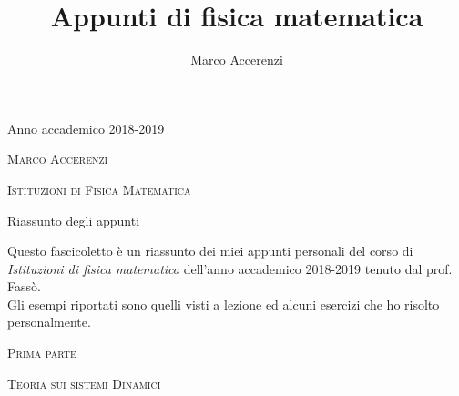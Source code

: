 \documentclass[11pt,a4paper,twoside]{book}
\author{Marco Accerenzi}
\date{}
\title{Appunti di fisica matematica}
\theoremstyle{esss}
\theoremstyle{dotless}
\numberwithin{equation}{section} %
\begin{document}

\frontmatter
\pagestyle{empty}

\begin{titlepage}
	\begin{center}

	\begin{center}
		\centering
		Anno accademico 2018-2019\par
		\vspace{.05\textheight}
	\end{center}	

		\vspace{.1\textheight}
		{\LARGE\scshape \textsc{Marco Accerenzi}\par}
		\vspace{.1\textheight}
		\textsc{}\par
		\vspace{.05\textheight}
		{\Huge \textsc{Istituzioni di Fisica Matematica}\par}
		\vspace{.05\textheight}
		{\large Riassunto degli appunti\par}
		\vfill
		{\large
Questo fascicoletto è un riassunto dei miei appunti personali del corso di \textit{Istituzioni di fisica matematica} dell'anno accademico 2018-2019 tenuto dal prof. Fassò. \\Gli esempi riportati sono quelli visti a lezione ed alcuni esercizi che ho risolto personalmente.
  }
  \vspace{2cm} 
\end{center}
\end{titlepage}

\tableofcontents

\cleardoublepage
\mainmatter\setcounter{page}{1}
\pagestyle{fancy}
\thispagestyle{plain}
	\begin{center}
		\vspace{.1\textheight}
		{\LARGE\scshape \textsc{Prima parte}\par}
		\vspace{.1\textheight}
		\textsc{}\par
		\vspace{.05\textheight}
		{\Huge \textsc{Teoria sui sistemi Dinamici}\par}
		\vfill

\end{center}
\end{document}
